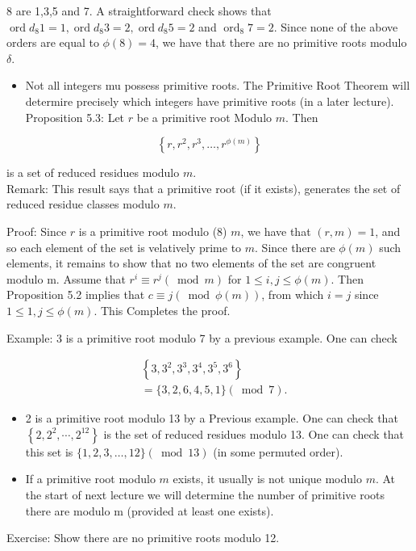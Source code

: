 \documentclass[10pt]{article}
\begin{document}
8 are 1,3,5 and 7. A straightforward check shows that $\operatorname{ord} d_{8} 1=1, \operatorname{ord} d_{8} 3=2, \operatorname{ord} d_{8} 5=2$ and $\operatorname{ord}_{8} 7=2$. Since none of the above orders are equal to $\phi(8)=4$, we have that there are no primitive roots modulo $\delta$.

\begin{itemize}
  \item Not all integers mu possess primitive roots. The Primitive Root Theorem will determire precisely which integers have primitive roots (in a later lecture).\\
Proposition 5.3: Let $r$ be a primitive root Modulo $m$. Then
\end{itemize}

$$
\left\{r, r^{2}, r^{3}, \ldots, r^{\phi(m)}\right\}
$$

is a set of reduced residues modulo $m$.\\
Remark: This result says that a primitive root (if it exists), generates the set of reduced residue classes modulo $m$.

Proof: Since $r$ is a primitive root modulo (8) $m$, we have that $(r, m)=1$, and so each element of the set is velatively prime to $m$. Since there are $\phi(m)$ such elements, it remains to show that no two elements of the set are congruent modulo m. Assume that $r^{i} \equiv r^{j}(\bmod m)$ for $1 \leq i, j \leq \phi(m)$. Then Proposition 5.2 implies that $c \equiv j(\bmod \phi(m))$, from which $i=j$ since $1 \leq 1, j \leq \phi(m)$. This Completes the proof.

Example: 3 is a primitive root modulo 7 by a previous example. One can check

$$
\begin{aligned}
& \left\{3,3^{2}, 3^{3}, 3^{4}, 3^{5}, 3^{6}\right\} \\
& =\{3,2,6,4,5,1\}(\bmod 7) .
\end{aligned}
$$

\begin{itemize}
  \item 2 is a primitive root modulo 13 by a Previous example. One can check that\\
$\left\{2,2^{2}, \cdots, 2^{12}\right\}$ is the set of reduced residues modulo 13. One can check that this set is $\{1,2,3, \ldots, 12\}(\bmod 13)$ (in some permuted order).
  \item If a primitive root modulo $m$ exists, it usually is not unique modulo $m$. At the start of next lecture we will determine the number of primitive roots there are modulo m (provided at least one exists).
\end{itemize}

Exercise: Show there are no primitive roots modulo 12.
\end{document}
